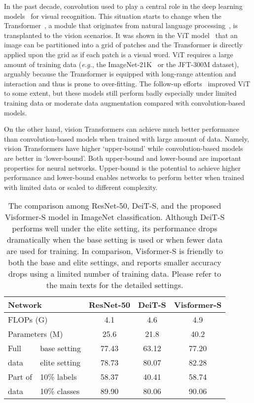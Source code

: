 \documentclass[10pt,twocolumn,letterpaper]{article}
\begin{document}
In the past decade, convolution used to play a central role in the deep learning models~\cite{lecun2015deep, simonyan2014very, szegedy2015going, he2016deep} for visual recognition. This situation starts to change when the Transformer~\cite{vaswani2017attention}, a module that originates from natural language processing~\cite{vaswani2017attention, devlin2018bert,radford2018improving}, is transplanted to the vision scenarios. It was shown in the ViT model~\cite{dosovitskiy2020image} that an image can be partitioned into a grid of patches and the Transformer is directly applied upon the grid as if each patch is a visual word. ViT requires a large amount of training data (\textit{e.g.}, the ImageNet-21K~\cite{deng2009imagenet} or the JFT-300M dataset), arguably because the Transformer is equipped with long-range attention and interaction and thus is prone to over-fitting. The follow-up efforts~\cite{touvron2020training} improved ViT to some extent, but these models still perform badly especially under limited training data or moderate data augmentation compared with convolution-based models.

On the other hand, vision Transformers can achieve much better performance than convolution-based models when trained with large amount of data. Namely, vision Transformers have higher `upper-bound' while convolution-based models are better in `lower-bound'. Both upper-bound and lower-bound are important properties for neural networks. Upper-bound is the potential to achieve higher performance and lower-bound enables networks to perform better when trained with limited data or scaled to different complexity.

\begin{table}
\begin{center}
\setlength{\tabcolsep}{0.12cm}
\begin{tabular}{|l|l|c|c|c|}
\hline
\multicolumn{2}{|l|}{Network} & ResNet-50 & DeiT-S & Visformer-S \\
\hline\hline
\multicolumn{2}{|l|}{FLOPs (G)} & 4.1 & 4.6 & 4.9 \\
\hline
\multicolumn{2}{|l|}{Parameters (M)} & 25.6 & 21.8 & 40.2 \\
\hline\hline
Full & base setting  & 77.43 & 63.12 & 77.20 \\
\cline{2-5}
data & elite setting & 78.73 & 80.07 & 82.28 \\
\hline
Part of & 10\% labels & 58.37 &40.41 & 58.74 \\
\cline{2-5}
data & 10\% classes  & 89.90  &80.06  &  90.06 \\
\hline
\end{tabular}
\end{center}
\caption{The comparison among ResNet-50, DeiT-S, and the proposed Visformer-S model in ImageNet classification. Although DeiT-S performs well under the elite setting, its performance drops dramatically when the base setting is used or when fewer data are used for training. In comparison, Visformer-S is friendly to both the base and elite settings, and reports smaller accuracy drops using a limited number of training data. Please refer to the main texts for the detailed settings.}
\label{tab:introduction}
\end{table}
\end{document}
